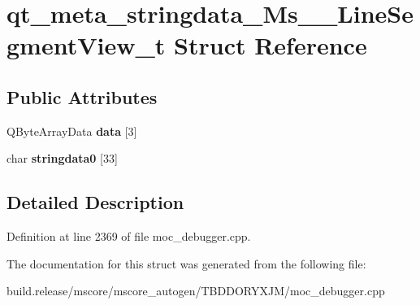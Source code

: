 \hypertarget{structqt__meta__stringdata___ms_____line_segment_view__t}{}\section{qt\+\_\+meta\+\_\+stringdata\+\_\+\+Ms\+\_\+\+\_\+\+Line\+Segment\+View\+\_\+t Struct Reference}
\label{structqt__meta__stringdata___ms_____line_segment_view__t}
\subsection*{Public Attributes}
\begin{DoxyCompactItemize}
\item 
\mbox{\label{structqt__meta__stringdata___ms_____line_segment_view__t_ad9d1f66dab2205f93a3782fba7037d20}} 
Q\+Byte\+Array\+Data {\bfseries data} \mbox{[}3\mbox{]}
\item 
\mbox{\label{structqt__meta__stringdata___ms_____line_segment_view__t_a4239cfb92dc33e8b963b01a02589cbae}} 
char {\bfseries stringdata0} \mbox{[}33\mbox{]}
\end{DoxyCompactItemize}


\subsection{Detailed Description}


Definition at line 2369 of file moc\+\_\+debugger.\+cpp.



The documentation for this struct was generated from the following file\+:\begin{DoxyCompactItemize}
\item 
build.\+release/mscore/mscore\+\_\+autogen/\+T\+B\+D\+D\+O\+R\+Y\+X\+J\+M/moc\+\_\+debugger.\+cpp\end{DoxyCompactItemize}
